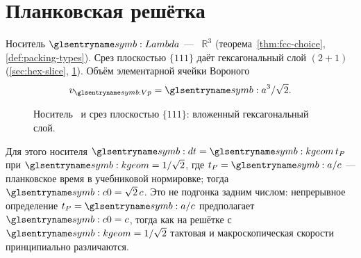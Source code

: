 \section{Планковская решётка}
\label{sec:planck-lattice}

\begin{definition}
\label{def:planck-lattice}
Носитель $\carrierLattice$ --- \latGCK\ $\mathbb{R}^3$
(теорема~\ref{thm:fcc-choice}, \cref{def:packing-types}).
Срез плоскостью $\{111\}$ даёт гексагональный слой $(2{+}1)$ (\cref{sec:hex-slice}, \cref{fig:carrier-fcc-111-slice}).
Объём элементарной ячейки Вороного
\[
  v_{\hv}=\caStepSpace^3/\sqrt{2}.
\]
\end{definition}

\begin{figure}[htbp]
  \centering
  
  \caption{Носитель \latGCKshort\ и срез плоскостью $\{111\}$: вложенный гексагональный слой.}
  \label{fig:carrier-fcc-111-slice}
\end{figure}

Для этого носителя $\htick=\caKappaGeom\, t_P$ при $\caKappaGeom=1/\sqrt{2}$,
где $t_P=\caStepSpace/c$ --- планковское время в учебниковой нормировке; тогда $\caSignalSpeed=\sqrt{2}\,c$.
Это не подгонка задним числом: непрерывное определение $t_P=\caStepSpace/c$ предполагает $\caSignalSpeed=c$,
тогда как на решётке с $\caKappaGeom=1/\sqrt{2}$ тактовая и макроскопическая скорости
принципиально различаются.

